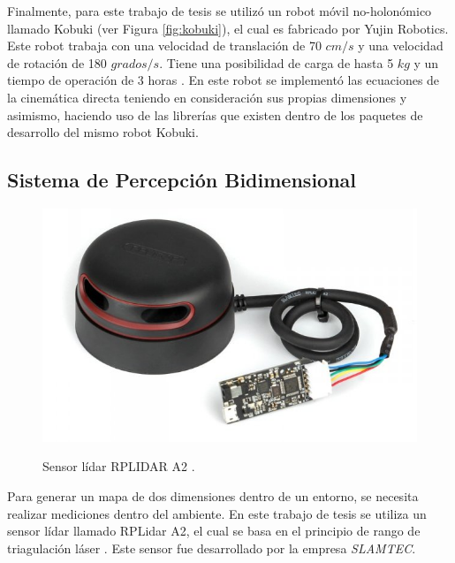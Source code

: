 Finalmente, para este trabajo de tesis se utilizó un robot móvil no-holonómico llamado 
Kobuki (ver Figura \ref{fig:kobuki}), el cual es fabricado por Yujin Robotics. Este robot 
trabaja con una velocidad de translación de 70 $cm/s$ y una velocidad de rotación de 180 
$grados/s$. Tiene una posibilidad de carga de hasta 5 $kg$ y un tiempo de operación de 3 
horas \cite{aboutKobuki}. En este robot se implementó las ecuaciones de la cinemática 
directa teniendo en consideración sus propias dimensiones y asimismo, haciendo
uso de las librerías que existen dentro de los paquetes de desarrollo del mismo robot Kobuki.


\subsection{Sistema de Percepción Bidimensional}
\begin{figure}%
	\centering \footnotesize
 	{\includegraphics[width=0.60\linewidth]{images/rplidar.JPG}}
 	\captionsetup{font=footnotesize}
 	\caption[Sensor lídar RPLidar A2.]{Sensor lídar RPLIDAR A2 \cite{sensorLidar}.}
 	\label{f:lidar}
\end{figure}

Para generar un mapa de dos dimensiones dentro de un entorno, se necesita realizar 
mediciones dentro del ambiente. En este trabajo de tesis se utiliza un sensor lídar
llamado RPLidar A2, el cual se basa en el principio de rango de triagulación láser
\cite{amann2001laser}. Este sensor fue desarrollado por la empresa \textit{SLAMTEC}.

